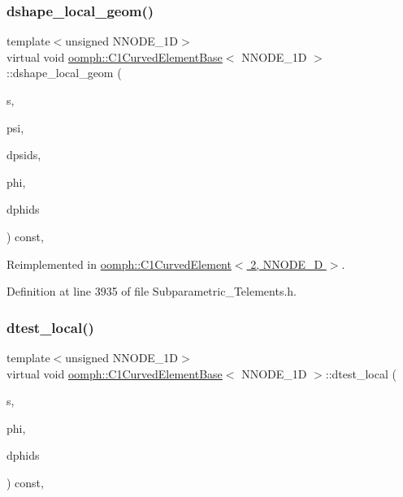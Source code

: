 \subsubsection{\texorpdfstring{dshape\+\_\+local\+\_\+geom()}{dshape\_local\_geom()}}
{\footnotesize\ttfamily template$<$unsigned N\+N\+O\+D\+E\+\_\+1D$>$ \\
virtual void \hyperlink{classoomph_1_1C1CurvedElementBase}{oomph\+::\+C1\+Curved\+Element\+Base}$<$ N\+N\+O\+D\+E\+\_\+1D $>$\+::dshape\+\_\+local\+\_\+geom (\begin{DoxyParamCaption}\item[{const \hyperlink{classoomph_1_1Vector}{Vector}$<$ double $>$ \&}]{s,  }\item[{\hyperlink{classoomph_1_1Shape}{Shape} \&}]{psi,  }\item[{\hyperlink{classoomph_1_1DShape}{D\+Shape} \&}]{dpsids,  }\item[{\hyperlink{classoomph_1_1Shape}{Shape} \&}]{phi,  }\item[{\hyperlink{classoomph_1_1DShape}{D\+Shape} \&}]{dphids }\end{DoxyParamCaption}) const\hspace{0.3cm}{\ttfamily [inline]}, {\ttfamily [virtual]}}



Reimplemented in \hyperlink{classoomph_1_1C1CurvedElement_3_012_00_01NNODE__1D_01_4_ad7457d81744bbb7596ce70f7d1b576ce}{oomph\+::\+C1\+Curved\+Element$<$ 2, N\+N\+O\+D\+E\+\_\+D $>$}.



Definition at line 3935 of file Subparametric\+\_\+\+Telements.\+h.

\mbox{\label{classoomph_1_1C1CurvedElementBase_a49a851713b2d274f14602f05733470fa}} 
\subsubsection{\texorpdfstring{dtest\+\_\+local()}{dtest\_local()}}
{\footnotesize\ttfamily template$<$unsigned N\+N\+O\+D\+E\+\_\+1D$>$ \\
virtual void \hyperlink{classoomph_1_1C1CurvedElementBase}{oomph\+::\+C1\+Curved\+Element\+Base}$<$ N\+N\+O\+D\+E\+\_\+1D $>$\+::dtest\+\_\+local (\begin{DoxyParamCaption}\item[{const \hyperlink{classoomph_1_1Vector}{Vector}$<$ double $>$ \&}]{s,  }\item[{\hyperlink{classoomph_1_1Shape}{Shape} \&}]{phi,  }\item[{\hyperlink{classoomph_1_1DShape}{D\+Shape} \&}]{dphids }\end{DoxyParamCaption}) const\hspace{0.3cm}{\ttfamily [inline]}, {\ttfamily [virtual]}}



